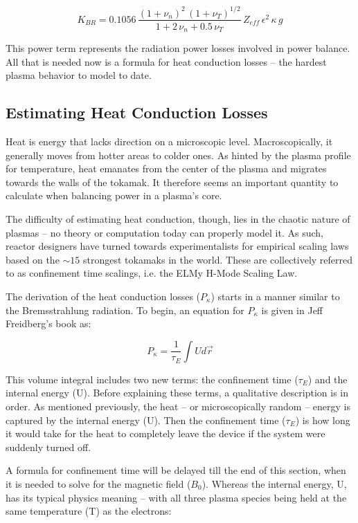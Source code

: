 \begin{equation}
	K_{BR} = 0.1056 \, \frac{ (1+\nu_n)^2 \, (1+\nu_T)^{1/2} }{1+2 \, \nu_n + 0.5 \, \nu_T} \, Z_{eff} \, \epsilon^2 \, \kappa \, g
\end{equation}

This power term represents the radiation power losses involved in power balance. All that is needed now is a formula for heat conduction losses -- the hardest plasma behavior to model to date.

\subsection{Estimating Heat Conduction Losses}

Heat is energy that lacks direction on a microscopic level. Macroscopically, it generally moves from hotter areas to colder ones. As hinted by the plasma profile for temperature, heat emanates from the center of the plasma and migrates towards the walls of the tokamak. It therefore seems an important quantity to calculate when balancing power in a plasma's core.

The difficulty of estimating heat conduction, though, lies in the chaotic nature of plasmas -- no theory or computation today can properly model it. As such, reactor designers have turned towards experimentalists for empirical scaling laws based on the $\sim15$ strongest tokamaks in the world. These are collectively referred to as confinement time scalings, i.e. the ELMy H-Mode Scaling Law.

The derivation of the heat conduction losses ($P_\kappa$) starts in a manner similar to the Bremsstrahlung radiation. To begin, an equation for $P_\kappa$ is given in Jeff Freidberg's book as:

\begin{equation}
	P_\kappa = \frac{1}{\tau_E} \int U d \vec r
\end{equation}

This volume integral includes two new terms: the confinement time ($\tau_E$) and the internal energy (U). Before explaining these terms, a qualitative description is in order. As mentioned previously, the heat -- or microscopically random -- energy is captured by the internal energy (U). Then the confinement time ($\tau_E$) is how long it would take for the heat to completely leave the device if the system were suddenly turned off.

A formula for confinement time will be delayed till the end of this section, when it is needed to solve for the magnetic field ($B_0$). Whereas the internal energy, U, has its typical physics meaning -- with all three plasma species being held at the same temperature (T) as the electrons:

